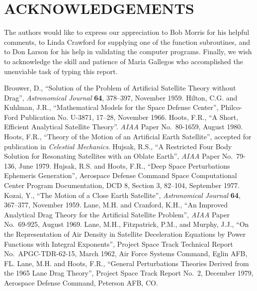 \newpage
{}
\section*{ACKNOWLEDGEMENTS}
The authors would like to express our appreciation to Bob Morris for his
helpful comments, to Linda Crawford for supplying one of the function
subroutines, and to Don Larson for his help in validating the computer
programs.  Finally, we wish to acknowledge the skill and patience of Maria
Gallegos who accomplished the unenviable task of typing this report.

\newpage
{}
\begin{thebibliography}{99}
\bibitem{}
Brouwer, D., ``Solution of the Problem of Artificial Satellite Theory without
Drag'', {\em Astronomical Journal\/} {\bf 64}, 378--397, November 1959.
\bibitem{}
Hilton, C.G. and Kuhlman, J.R., ``Mathematical Models for the Space Defense
Center'', Philco-Ford Publication No. U-3871, 17--28, November 1966.
\bibitem{}
Hoots, F.R., ``A Short, Efficient Analytical Satellite Theory''.  {\em AIAA\/}
Paper No.\ 80-1659, August 1980.
\bibitem{}
Hoots, F.R., ``Theory of the Motion of an Artificial Earth Satellite'',
accepted for publication in {\em Celestial Mechanics}.
\bibitem{}
Hujsak, R.S., ``A Restricted Four Body Solution for Resonating Satellites with
an Oblate Earth'', {\em AIAA\/} Paper No.\ 79-136, June 1979.
\bibitem{}
Hujsak, R.S. and Hoots, F.R., ``Deep Space Perturbations Ephemeris
Generation'', Aerospace Defense Command Space Computational Center Program
Documentation, DCD 8, Section 3, 82--104, September 1977.
\bibitem{}
Kozai, Y., ``The Motion of a Close Earth Satellite'', {\em Astronomical
Journal\/} {\bf 64}, 367--377, November 1959.
\bibitem{}
Lane, M.H. and Cranford, K.H., ``An Improved Analytical Drag Theory for the
Artificial Satellite Problem'', {\em AIAA\/} Paper No.\ 69-925, August 1969.
\bibitem{}
Lane, M.H., Fitzpatrick, P.M., and Murphy, J.J., ``On the Representation of
Air Density in Satellite Deceleration Equations by Power Functions with
Integral Exponents'', Project Space Track Technical Report No.\
APGC-TDR-62-15, March 1962, Air Force Systems Command, Eglin AFB, FL.
\bibitem{}
Lane, M.H. and Hoots, F.R., ``General Perturbations Theories Derived from the
1965 Lane Drag Theory'', Project Space Track Report No.\ 2, December 1979,
Aerospace Defense Command, Peterson AFB, CO.
\end{thebibliography}

